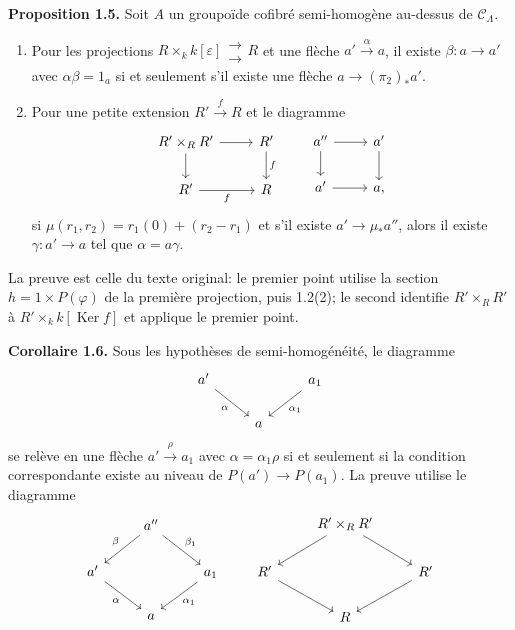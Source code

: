 \documentclass[11pt]{article}
\providecommand{\Ker}{\operatorname{Ker}}
\providecommand{\CL}{\mathcal C_\Lambda}
\begin{document}
\textbf{Proposition 1.5.} Soit $A$ un groupo\"ide cofibr\'e semi-homog\`ene au-dessus de $\CL$.
\begin{enumerate}[label=(\arabic*)]
\item Pour les projections $R\times_k k[\varepsilon]\mathrel{\substack{\longrightarrow\\[-.6ex]\longrightarrow}} R$ et une fl\`eche $a'\xrightarrow{\alpha}a$, il existe $\beta:a\to a'$ avec $\alpha\beta=1_a$ si et seulement s'il existe une fl\`eche $a\to(\pi_2)_*a'$.
\item Pour une petite extension $R'\xrightarrow{f}R$ et le diagramme
\[
\begin{tikzcd}
 R'\times_R R' \arrow[r] \arrow[d] & R' \arrow[d,"f"]\\
 R' \arrow[r,"f"'] & R
\end{tikzcd}
\qquad
\begin{tikzcd}
 a'' \arrow[r] \arrow[d] & a' \arrow[d]\\
 a' \arrow[r] & a,
\end{tikzcd}
\]
si $\mu(r_1,r_2)=r_1(0)+(r_2-r_1)$ et s'il existe $a'\to\mu_*a''$, alors il existe $\gamma:a'\to a$ tel que $\alpha=a\gamma$.
\end{enumerate}
La preuve est celle du texte original: le premier point utilise la section $h=1\times P(\varphi)$ de la premi\`ere projection, puis 1.2(2); le second identifie $R'\times_RR'$ \`a $R'\times_kk[\Ker f]$ et applique le premier point.

\textbf{Corollaire 1.6.} Sous les hypoth\`eses de semi-homog\'en\'eit\'e, le diagramme
\[
\begin{tikzcd}
 a' \arrow[dr,"\alpha"'] && a_1 \arrow[dl,"\alpha_1"]\\
& a &
\end{tikzcd}
\]
se rel\`eve en une fl\`eche $a'\xrightarrow{\rho}a_1$ avec $\alpha=\alpha_1\rho$ si et seulement si la condition correspondante existe au niveau de $P(a')\to P(a_1)$. La preuve utilise le diagramme
\[
\begin{tikzcd}
& a'' \arrow[dl,"\beta"'] \arrow[dr,"\beta_1"] &\\
a' \arrow[dr,"\alpha"'] && a_1 \arrow[dl,"\alpha_1"]\\
& a &
\end{tikzcd}
\qquad
\begin{tikzcd}
& R'\times_R R' \arrow[dl] \arrow[dr] &\\
R' \arrow[dr] && R' \arrow[dl]\\
& R &
\end{tikzcd}
\]
\end{document}
